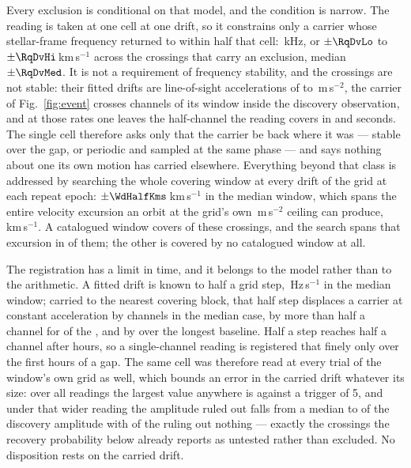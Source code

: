Every exclusion is conditional on that model, and the condition is narrow. The
reading is taken at one cell at one drift, so it constrains only a carrier
whose stellar-frame frequency returned to within half that cell:
\TjChanKHz\,kHz, or $\pm\RqDvLo$ to $\pm\RqDvHi$\,km\,s$^{-1}$ across the
\RcNExcl{} crossings that carry an exclusion, median $\pm\RqDvMed$. It is not
a requirement of frequency stability, and the crossings are not stable: their
fitted drifts are line-of-sight accelerations of \ZtALosLo{} to
\ZtALosHi\,m\,s$^{-2}$, the carrier of Fig.~\ref{fig:event} crosses
\EvADriftChan{} channels of its window inside the discovery observation, and
at those rates one leaves the half-channel the reading covers in
\ZtSxLeaveSec{} and \ZtCpLeaveSec{} seconds. The single cell therefore asks
only that the carrier be back where it was --- stable over the gap, or
periodic and sampled at the same phase --- and says nothing about one its own
motion has carried elsewhere. Everything beyond that class is addressed
by searching the whole covering window at every drift of the grid at each
repeat epoch: $\pm\WdHalfKms$\,km\,s$^{-1}$ in the median window, which spans
the entire velocity excursion an orbit at the grid's own
\WdAGrid\,m\,s$^{-2}$ ceiling can produce, \WdOrbKms\,km\,s$^{-1}$. A
catalogued window covers \WdNOrbTot{} of these \RcNExcl{} crossings, and the
search spans that excursion in \WdNOrbSpan{} of them; the other
\WdNNoCov{} is covered by no catalogued window at all.

The registration has a limit in time, and it belongs to the model rather than
to the arithmetic. A fitted drift is known to half a grid step,
\ZtStepMed\,Hz\,s$^{-1}$ in the median window; carried to the nearest
covering block, that half step displaces a carrier at constant acceleration by
\ZtRegChanMed{} channels in the median case, by more than half a channel for
\ZtNRegNear{} of the \RcNExcl, and by \ZtRegChanFarMed{} over the longest
baseline. Half a step reaches half a channel after \ZtRegHoursMed{} hours, so
a single-channel reading is registered that finely only over the first hours
of a gap. The same cell was therefore read at every trial of the window's own
grid as well, which bounds an error in the carried drift whatever its size:
over all \RcNRepeatMeas{} readings the largest value anywhere is \RcTMax{}
against a trigger of 5, and under that wider reading the amplitude ruled out
falls from a median \RcFracMed{} to \ZtFracWideMed{} of the discovery
amplitude with \ZtNWideVac{} of the \RcNExcl{} ruling out nothing --- exactly
the crossings the recovery probability below already reports as untested
rather than excluded. No disposition rests on the carried drift.

